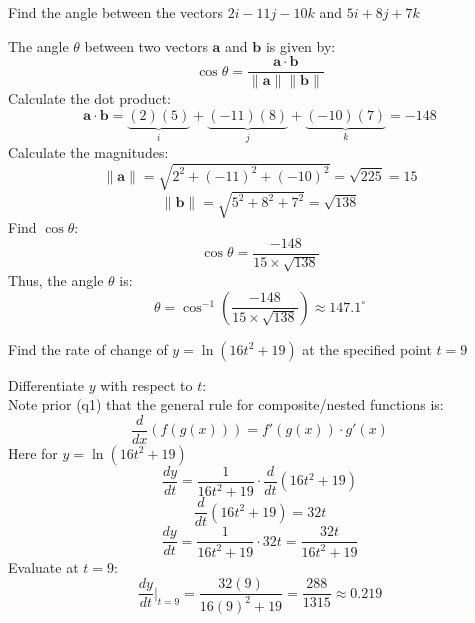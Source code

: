 \documentclass[a4paper, 12pt]{report}
\begin{document}
    \newpage
    \begin{tcolorbox}[title=\color{black}{\section{Q2}}, colback=white, colframe=black!30!white, boxrule=0.4mm, width=1\textwidth]
        Find the angle between the vectors \( 2 i-11 j-10 k \) and \( 5 i+8 j+7 k \)
    \end{tcolorbox}
    
    The angle \( \theta \) between two vectors \(\mathbf{a}\) and \(\mathbf{b}\) is given by:
    \[\cos \theta = \frac{\mathbf{a} \cdot \mathbf{b}}{\|\mathbf{a}\| \|\mathbf{b}\|}\]
    Calculate the dot product:
    \[\mathbf{a} \cdot \mathbf{b} = \underbrace{(2)(5)}_i + \underbrace{(-11)(8)}_j + \underbrace{(-10)(7)}_k = -148\]
    Calculate the magnitudes:
    \[\|\mathbf{a}\| = \sqrt{2^2 + (-11)^2 + (-10)^2} = \sqrt{225} = 15\]
    \[\|\mathbf{b}\| = \sqrt{5^2 + 8^2 + 7^2} = \sqrt{138}\]
    Find \(\cos \theta\):
    \[\cos \theta = \frac{-148}{15 \times \sqrt{138}}\]
    Thus, the angle \(\theta\) is:
    \[\boxed{\theta = \cos^{-1}\left(\frac{-148}{15 \times \sqrt{138}}\right) \approx 147.1^{\circ}}\]
    
    \newpage    
    \begin{tcolorbox}[title=\color{black}{\section{Q3}}, colback=white, colframe=black!30!white, boxrule=0.4mm, width=1\textwidth]
        Find the rate of change of \( y=\ln \left(16 t^{2}+19\right) \) at the specified point \( t=9 \)
    \end{tcolorbox}
        
    Differentiate \( y \) with respect to \( t \):\\[1em]
    Note prior (q1) that the general rule for composite/nested functions is:
    \[\frac{d}{dx}(f(g(x))) = f'(g(x))\cdot g'(x)\]
    Here for $y=\ln \left(16 t^{2}+19\right)$
    \[\frac{dy}{dt} = \frac{1}{16t^2 + 19} \cdot \frac{d}{dt}(16t^2 + 19)\]
    \[\frac{d}{dt}(16t^2 + 19) = 32t\]
    \[\frac{dy}{dt} = \frac{1}{16t^2 + 19} \cdot 32t = \frac{32t}{16t^2 + 19}\]
    Evaluate at \( t = 9 \):
    \[\boxed{\frac{dy}{dt} \bigg|_{t=9} = \frac{32 (9)}{16(9)^2 + 19} = \frac{288}{1315} \approx 0.219}\]
    
\end{document}
